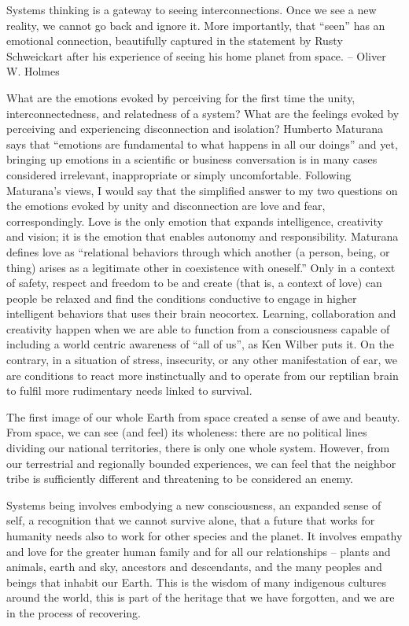 Systems thinking is a gateway to seeing interconnections. Once we see a new reality, we cannot go back and ignore it. More importantly, that “seen” has an emotional connection, beautifully captured in the statement by Rusty Schweickart after his experience of seeing his home planet from space. – Oliver W. Holmes

What are the emotions evoked by perceiving for the first time the unity, interconnectedness, and relatedness of a system?  What are the feelings evoked by perceiving and experiencing disconnection and isolation?  Humberto Maturana says that “emotions are fundamental to what happens in all our doings” and yet, bringing up emotions in a scientific or business conversation is in many cases considered irrelevant, inappropriate or simply uncomfortable. Following Maturana’s views, I would say that the simplified answer to my two questions on the emotions evoked by unity and disconnection are love and fear, correspondingly. Love is the only emotion that expands intelligence, creativity and vision; it is the emotion that enables autonomy and responsibility. Maturana defines love as “relational behaviors through which another (a person, being, or thing) arises as a legitimate other in coexistence with oneself.”  Only in a context of safety, respect and freedom to be and create (that is, a context of love) can people be relaxed and find the conditions conductive to engage in higher intelligent behaviors that uses their brain neocortex. Learning, collaboration and creativity happen when we are able to function from a consciousness capable of including a world centric awareness of “all of us”, as Ken Wilber puts it. On the contrary, in a situation of stress, insecurity, or any other manifestation of ear, we are conditions to react more instinctually and to operate from our reptilian brain to fulfil more rudimentary needs linked to survival.

The first image of our whole Earth from space created a sense of awe and beauty. From space, we can see (and feel) its wholeness: there are no political lines dividing our national territories, there is only one whole system. However, from our terrestrial and regionally bounded experiences, we can feel that the neighbor tribe is sufficiently different and threatening to be considered an enemy.

Systems being involves embodying a new consciousness, an expanded sense of self, a recognition that we cannot survive alone, that a future that works for humanity needs also to work for other species and the planet. It involves empathy and love for the greater human family and for all our relationships – plants and animals, earth and sky, ancestors and descendants, and the many peoples and beings that inhabit our Earth. This is the wisdom of many indigenous cultures around the world, this is part of the heritage that we have forgotten, and we are in the process of recovering.

